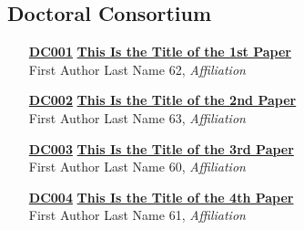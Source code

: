 \subsection{Doctoral Consortium}
\begin{enumerate}
\item[\href{https://doi.org/10.1145/1111111.1111128}{\textbf{DC001}}]
\href{https://doi.org/10.1145/1111111.1111128}{\textbf{This Is the Title of the 1st Paper}}\\
First Author Last Name 62, \emph{Affiliation}\\

\item[\href{https://doi.org/10.1145/1111111.1111129}{\textbf{DC002}}]
\href{https://doi.org/10.1145/1111111.1111129}{\textbf{This Is the Title of the 2nd Paper}}\\
First Author Last Name 63, \emph{Affiliation}\\

\item[\href{https://doi.org/10.1145/1111111.1111130}{\textbf{DC003}}]
\href{https://doi.org/10.1145/1111111.1111130}{\textbf{This Is the Title of the 3rd Paper}}\\
First Author Last Name 60, \emph{Affiliation}\\

\item[\href{https://doi.org/10.1145/1111111.1111131}{\textbf{DC004}}]
\href{https://doi.org/10.1145/1111111.1111131}{\textbf{This Is the Title of the 4th Paper}}\\
First Author Last Name 61, \emph{Affiliation}\\
\end{enumerate}


